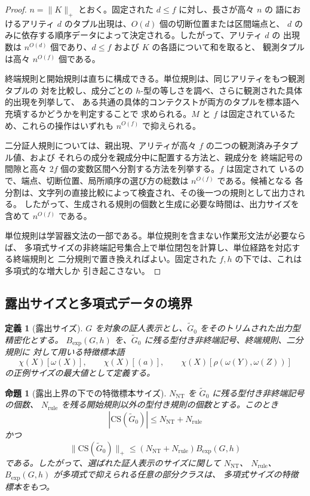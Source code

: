 \documentclass[11pt,a4paper]{ltjsarticle}
\newtheorem{proposition}[theorem]{命題}
\newtheorem{definition}[theorem]{定義}
\theoremstyle{remark}
\newcommand{\CS}{\mathrm{CS}}
\begin{document}
\begin{proof}
\(n=\|K\|_+\) とおく。固定された \(d\le f\) に対し、長さが高々 \(n\) の
語におけるアリティ \(d\) のタプル出現は、\(O(d)\) 個の切断位置または区間端点と、
\(d\) のみに依存する順序データによって決定される。したがって、アリティ \(d\) の
出現数は \(n^{O(d)}\) 個であり、\(d\le f\) および \(K\) の各語について和を取ると、
観測タプルは高々 \(n^{O(f)}\) 個である。

終端規則と開始規則は直ちに構成できる。単位規則は、同じアリティをもつ観測タプルの
対を比較し、成分ごとの \(h\)-型の等しさを調べ、さらに観測された具体的出現を列挙して、
ある共通の具体的コンテクストが両方のタプルを標本語へ充填するかどうかを判定することで
求められる。\(M\) と \(f\) は固定されているため、これらの操作はいずれも
\(n^{O(f)}\) で抑えられる。

二分証人規則については、親出現、アリティが高々 \(f\) の二つの観測済み子タプル値、および
それらの成分を親成分中に配置する方法と、親成分を
終端記号の間隙と高々 \(2f\) 個の変数区間へ分割する方法を列挙する。\(f\) は固定されて
いるので、端点、切断位置、局所順序の選び方の総数は \(n^{O(f)}\) である。候補となる
各分割は、文字列の直接比較によって検査され、その後一つの規則として出力される。
したがって、生成される規則の個数と生成に必要な時間は、出力サイズを含めて
\(n^{O(f)}\) である。

単位規則は学習器文法の一部である。単位規則を含まない作業形文法が必要ならば、
多項式サイズの非終端記号集合上で単位閉包を計算し、単位経路を対応する終端規則と
二分規則で置き換えればよい。固定された \(f,h\) の下では、これは多項式的な増大しか
引き起こさない。
\end{proof}


\subsection{露出サイズと多項式データの境界}
\label{subsec:exposure-boundary}

\begin{definition}[露出サイズ]
\label{def:exposure-size}
\(G\) を対象の証人表示とし、\(\widetilde G_0\) をそのトリムされた出力型精密化とする。
\(B_{\mathrm{exp}}(G,h)\) を、\(\widetilde G_0\) に残る型付き非終端記号、終端規則、二分規則に
対して用いる特徴標本語
\[
  \chi(X)[\omega(X)],\qquad
  \chi(X)[(a)],\qquad
  \chi(X)[\rho(\omega(Y),\omega(Z))]
\]
の正例サイズの最大値として定義する。
\end{definition}

\begin{proposition}[露出上界の下での特徴標本サイズ]
\label{prop:cs-exposure-bound}
\(N_{\mathrm{NT}}\) を \(\widetilde G_0\) に残る型付き非終端記号の個数、
\(N_{\mathrm{rule}}\) を残る開始規則以外の型付き規則の個数とする。このとき
\[
  |\CS(\widetilde G_0)|
  \le N_{\mathrm{NT}}+N_{\mathrm{rule}}
\]
かつ
\[
  \|\CS(\widetilde G_0)\|_+
  \le
  (N_{\mathrm{NT}}+N_{\mathrm{rule}})
  B_{\mathrm{exp}}(G,h)
\]
である。したがって、選ばれた証人表示のサイズに関して \(N_{\mathrm{NT}}\)、
\(N_{\mathrm{rule}}\)、\(B_{\mathrm{exp}}(G,h)\) が多項式で抑えられる任意の部分クラスは、
多項式サイズの特徴標本をもつ。
\end{proposition}
\end{document}
